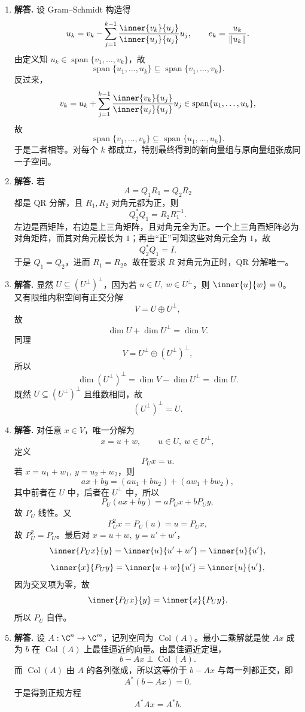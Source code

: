\begin{enumerate}[label=\textbf{\arabic*.}, leftmargin=*, itemsep=1em]
\item \textbf{解答.} 设 Gram--Schmidt 构造得
\[
u_k=v_k-\sum_{j=1}^{k-1}\frac{\inner{v_k}{u_j}}{\inner{u_j}{u_j}}u_j,\qquad e_k=\frac{u_k}{\|u_k\|}.
\]
由定义知 $u_k\in \operatorname{span}\{v_1,\dots,v_k\}$，故
\[
\operatorname{span}\{u_1,\dots,u_k\}\subseteq \operatorname{span}\{v_1,\dots,v_k\}.
\]
反过来，
\[
v_k=u_k+\sum_{j=1}^{k-1}\frac{\inner{v_k}{u_j}}{\inner{u_j}{u_j}}u_j\in \operatorname{span}\{u_1,\dots,u_k\},
\]
故
\[
\operatorname{span}\{v_1,\dots,v_k\}\subseteq \operatorname{span}\{u_1,\dots,u_k\}.
\]
于是二者相等。对每个 $k$ 都成立，特别最终得到的新向量组与原向量组张成同一子空间。

\item \textbf{解答.} 若
\[
A=Q_1R_1=Q_2R_2
\]
都是 QR 分解，且 $R_1,R_2$ 对角元都为正，则
\[
Q_2^*Q_1=R_2R_1^{-1}.
\]
左边是酉矩阵，右边是上三角矩阵，且对角元全为正。一个上三角酉矩阵必为对角矩阵，而其对角元模长为 $1$；再由“正”可知这些对角元全为 $1$，故
\[
Q_2^*Q_1=I.
\]
于是 $Q_1=Q_2$，进而 $R_1=R_2$。故在要求 $R$ 对角元为正时，QR 分解唯一。

\item \textbf{解答.} 显然 $U\subseteq (U^\perp)^\perp$，因为若 $u\in U,\ w\in U^\perp$，则 $\inner{u}{w}=0$。  
又有限维内积空间有正交分解
\[
V=U\oplus U^\perp,
\]
故
\[
\dim U+\dim U^\perp=\dim V.
\]
同理
\[
V=U^\perp\oplus (U^\perp)^\perp,
\]
所以
\[
\dim (U^\perp)^\perp=\dim V-\dim U^\perp=\dim U.
\]
既然 $U\subseteq (U^\perp)^\perp$ 且维数相同，故
\[
(U^\perp)^\perp=U.
\]

\item \textbf{解答.} 对任意 $x\in V$，唯一分解为
\[
x=u+w,\qquad u\in U,\ w\in U^\perp,
\]
定义
\[
P_Ux=u.
\]
若 $x=u_1+w_1,\ y=u_2+w_2$，则
\[
ax+by=(au_1+bu_2)+(aw_1+bw_2),
\]
其中前者在 $U$ 中，后者在 $U^\perp$ 中，所以
\[
P_U(ax+by)=aP_Ux+bP_Uy,
\]
故 $P_U$ 线性。又
\[
P_U^2x=P_U(u)=u=P_Ux,
\]
故 $P_U^2=P_U$。最后对 $x=u+w,\ y=u'+w'$，
\[
\inner{P_Ux}{y}=\inner{u}{u'+w'}=\inner{u}{u'},
\]
\[
\inner{x}{P_Uy}=\inner{u+w}{u'}=\inner{u}{u'},
\]
因为交叉项为零，故
\[
\inner{P_Ux}{y}=\inner{x}{P_Uy}.
\]
所以 $P_U$ 自伴。

\item \textbf{解答.} 设 $A:\C^n\to \C^m$，记列空间为 $\operatorname{Col}(A)$。最小二乘解就是使 $Ax$ 成为 $b$ 在 $\operatorname{Col}(A)$ 上最佳逼近的向量。由最佳逼近定理，
\[
b-Ax\perp \operatorname{Col}(A).
\]
而 $\operatorname{Col}(A)$ 由 $A$ 的各列张成，所以这等价于 $b-Ax$ 与每一列都正交，即
\[
A^*(b-Ax)=0.
\]
于是得到正规方程
\[
A^*Ax=A^*b.
\]


\end{enumerate}
